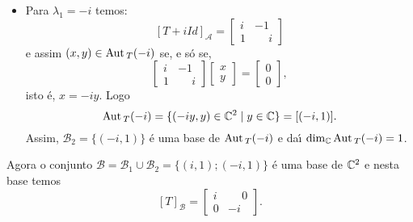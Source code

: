 \begin{exemplo}
\begin{enumerate}[label={\arabic*})]
\begin{solucao}
\begin{itemize}
\[                \]
                e assim $(x,y) \in \aut_T(i)$ se, e s\'o se,
                \[
                    \begin{bmatrix} -i & -1\\\phantom{-}1 & -i\end{bmatrix} \begin{bmatrix} x\\y\end{bmatrix}     = \begin{bmatrix} 0\\0\end{bmatrix},
                \]
                isto \'e, $x = iy$. Logo
                \[
                    \aut_T(i) = \{(iy,y) \in \complex^2 \mid y \in \complex\} = [(i,1)].
                \]
                Assim, $\mathcal{B}_1 = \{(i,1)\}$ \'e uma base de $\aut_T(i)$ e da{\'\i} $\dim_\complex\aut_T(i) = 1$.
                \item Para $\lambda_1 = -i$ temos:
                \[
                    [T + iId]_\mathcal{A} = \begin{bmatrix} i & -1\\1 & \phantom{-}i\end{bmatrix}
                \]
                e assim $(x,y) \in {\rm Aut\,}_T(-i)$ se, e s\'o se,
                \[
                    \begin{bmatrix} i & -1\\1 & \phantom{-}i\end{bmatrix} \begin{bmatrix} x\\y\end{bmatrix}     = \begin{bmatrix} 0\\0\end{bmatrix},
                \]
                isto \'e, $x = -iy$. Logo
                \[
                    {\rm Aut\,}_T(-i) = \{(-iy,y) \in \mathbb{C}^2 \mid y \in \mathbb{C}\} = [(-i,1)].
                \]
                Assim, $\mathcal{B}_2 = \{(-i,1)\}$ \'e uma base de ${\rm Aut\,}_T(-i)$ e da{\'\i} $\dim_{\mathbb{C}}{\rm Aut\,}_T(-i) = 1$.
            \end{itemize}
            Agora o conjunto $\mathcal{B} = \mathcal{B}_1 \cup \mathcal{B}_2 = \{(i,1);(-i,1)\}$ \'e uma base de $\mathbb{C}^2$ e nesta base temos
            \[
                [T]_\mathcal{B} = \begin{bmatrix} i & \phantom{-}0\\0 & -i\end{bmatrix}.
\]
\end{solucao}
\end{enumerate}
\end{exemplo}
